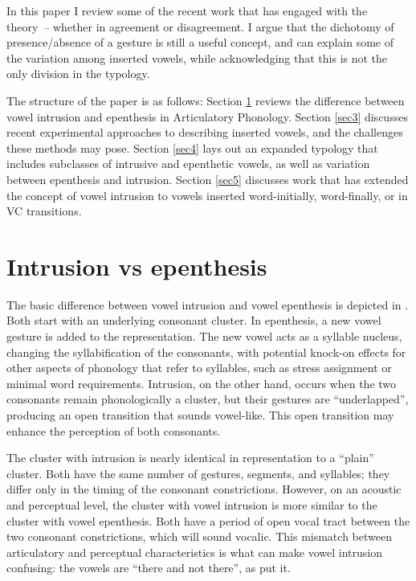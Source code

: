 \documentclass[output=paper,colorlinks,citecolor=brown]{langscibook}
\begin{document}
In this paper I review some of the recent work that has engaged with the theory~-- whether in agreement or disagreement. I argue that the dichotomy of presence\slash absence of a gesture is still a useful concept, and can explain some of the variation among inserted vowels, while acknowledging that this is not the only division in the typology. 

The structure of the paper is as follows: Section \ref{sec2} reviews the difference between vowel intrusion and epenthesis in Articulatory Phonology. Section \ref{sec3} discusses recent experimental approaches to describing inserted vowels, and the challenges these methods may pose. Section \ref{sec4} lays out an expanded typology that includes subclasses of intrusive and epenthetic vowels, as well as variation between epenthesis and intrusion. Section \ref{sec5} discusses work that has extended the concept of vowel intrusion to vowels inserted word-initially, word\hyp finally, or in VC transitions. 

\section{Intrusion vs epenthesis}\label{sec2}

The basic difference between vowel intrusion and vowel epenthesis is depicted in . Both start with an underlying consonant cluster. In epenthesis, a new vowel gesture is added to the representation. The new vowel acts as a syllable nucleus, changing the syllabification of the consonants, with potential knock-on effects for other aspects of phonology that refer to syllables, such as stress assignment or minimal word requirements. Intrusion, on the other hand, occurs when the two consonants remain phonologically a cluster, but their gestures are “underlapped”, producing an open transition that sounds vowel-like. This open transition may enhance the perception of both consonants. 

The cluster with intrusion is nearly identical in representation to a “plain” cluster. Both have the same number of gestures, segments, and syllables; they differ only in the timing of the consonant constrictions. However, on an acoustic and perceptual level, the cluster with vowel intrusion is more similar to the cluster with vowel epenthesis. Both have a period of open vocal tract between the two consonant constrictions, which will sound vocalic. This mismatch between articulatory and perceptual characteristics is what can make vowel intrusion confusing: the vowels are “there and not there”, as \citet{ring2014intrusive} put it.
\end{document}
